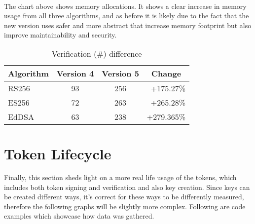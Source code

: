  \\
The chart above shows memory allocations. It shows a clear increase in memory usage from all three algorithms, and as before it is likely due to the fact that the new version uses safer and more abstract that increase memory footprint but also improve maintainability and security.

\begin{table}[h]
    \centering
    \begin{tabular}{lccr}
        \toprule
        Algorithm & Version 4 & Version 5 & \multicolumn{1}{c}{Change} \\
        \midrule
        RS256 & 93 & 256 & \textcolor{darkerred}{+175.27\%} \\
        ES256 & 72 & 263 & \textcolor{darkerred}{+265.28\%} \\
        EdDSA & 63 & 238 & \textcolor{darkerred}{+279.365\%} \\
        \bottomrule
    \end{tabular}
    \caption{Verification  (\#) difference }
\end{table} 

\section{Token Lifecycle}
Finally, this section sheds light on a more real life usage of the tokens, which includes both token signing and verification and also key creation. Since keys can be created different ways, it's correct for these ways to be differently measured, therefore the following graphs will be slightly more complex. Following are code examples which showcase how data was gathered.

